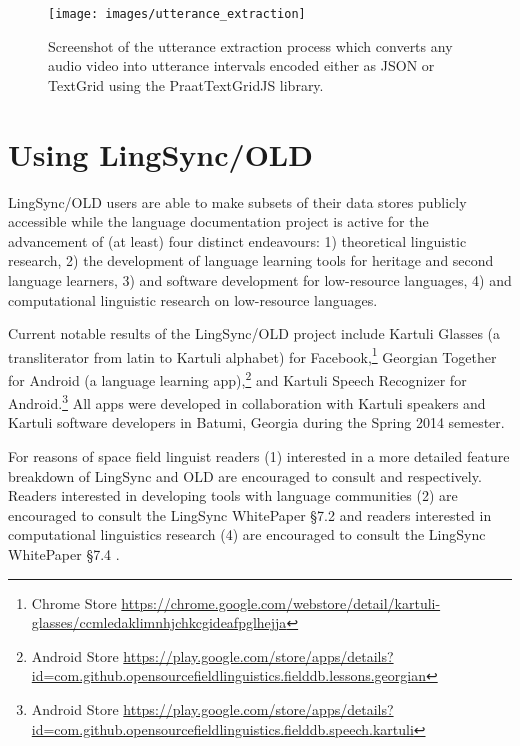\documentclass[11pt]{article}
\begin{document}
\begin{figure}
\begin{center}
\texttt{[image: images/utterance\_extraction]}
\caption{Screenshot of the utterance extraction process which converts any
audio video into utterance intervals encoded either as JSON or TextGrid using
the PraatTextGridJS library.}
\label{utterance_extraction_screenshot}
\end{center}
\end{figure}


\section{Using LingSync/OLD}\label{open-data}

LingSync/OLD users are able to make subsets of their data stores publicly
accessible while the language documentation project is active for the
advancement of (at least) four distinct endeavours: 1) theoretical linguistic
research, 2) the development of language learning
tools for heritage and second language learners, 3) and software development for 
low-resource languages,
4) and computational linguistic research on
low-resource languages.

Current notable results of the LingSync/OLD project include 
Kartuli Glasses (a transliterator from latin to Kartuli alphabet) for Facebook,\footnote{Chrome Store \url{https://chrome.google.com/webstore/detail/kartuli-glasses/ccmledaklimnhjchkcgideafpglhejja} } 
Georgian Together for Android (a language learning app),\footnote{ Android Store  \url{https://play.google.com/store/apps/details?id=com.github.opensourcefieldlinguistics.fielddb.lessons.georgian} } 
and Kartuli Speech Recognizer for Android.\footnote{ Android Store   \url{https://play.google.com/store/apps/details?id=com.github.opensourcefieldlinguistics.fielddb.speech.kartuli} } 
All apps were developed in collaboration with Kartuli speakers and Kartuli software developers in Batumi, Georgia during the Spring 2014 semester. 


For reasons of space field linguist readers (1) interested in a more detailed feature breakdown of LingSync and OLD are encouraged to consult \cite{lingsync:2012} and  \cite{dunham2014docs} respectively. Readers interested in developing tools with language communities (2) are encouraged to consult the LingSync WhitePaper \S 7.2 \cite{LingSync:2012:WP} and readers interested in computational linguistics research  (4)  are encouraged to consult the LingSync WhitePaper \S 7.4 \cite{LingSync:2012:WP} .
\end{document}
